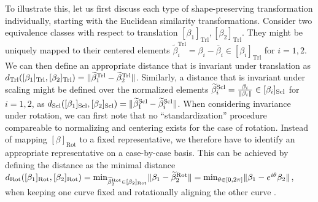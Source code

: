 To illustrate this, let us first discuss each type of shape-preserving transformation individually, starting with the Euclidean similarity transformations.
Consider two equivalence classes with respect to translation $[\beta_1]_\text{Trl}, [\beta_2]_\text{Trl}$.
They might be uniquely mapped to their centered elements $\widetilde\beta^\text{Trl}_i = \beta_i - \overline{\beta}_i \in [\beta_i]_\text{Trl}$ for $i=1,2$.
We can then define an appropriate distance that is invariant under translation as $d_\text{Trl}([\beta_1]_\text{Trl}, [\beta_2]_\text{Trl}) = \lVert\widetilde\beta^\text{Trl}_1 - \widetilde\beta^\text{Trl}_2\rVert$.
Similarly, a distance that is invariant under scaling might be defined over the normalized elements $\widetilde\beta^\text{Scl}_i = \frac{\beta_i}{\lVert\beta_i\rVert} \in [\beta_i]_\text{Scl}$ for $i = 1,2$, as $d_\text{Scl}([\beta_1]_\text{Scl}, [\beta_2]_\text{Scl}) = \lVert\widetilde\beta^\text{Scl}_1 - \widetilde\beta^\text{Scl}_i\rVert$.
When considering invariance under rotation, we can first note that no \enquote{standardization} procedure compareable to normalizing and centering exists for the case of rotation.
Instead of mapping $[\beta]_\text{Rot}$ to a fixed representative, we therefore have to identify an appropriate representative on a case-by-case basis.
This can be achieved by defining the distance as the minimal distance $d_\text{Rot}([\beta_1]_\text{Rot}, [\beta_2]_\text{Rot}) = \min_{\widetilde\beta^\text{Rot}_2 \in [\beta_2]_\text{Rot}} \lVert\beta_1 - \widetilde\beta^\text{Rot}_2\rVert = \min_{\theta \in [0,2\pi]} \lVert\beta_1 - e^{i\theta}\beta_2\rVert$, when keeping one curve fixed and rotationally aligning the other curve \parencite[compare e.g][]{Stoecker2021}.


